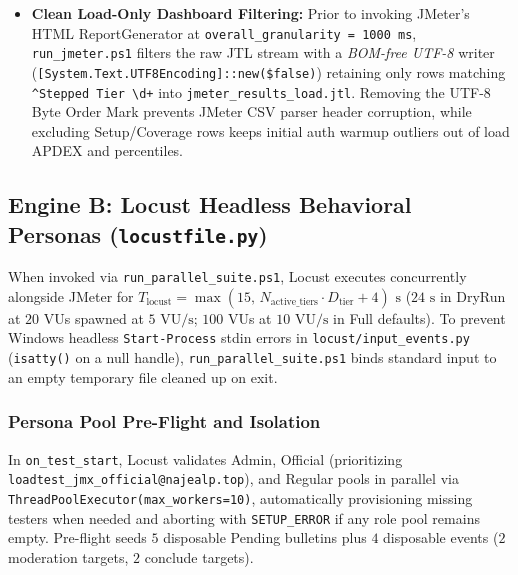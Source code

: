 \documentclass[11pt,letterpaper]{article}
\begin{document}
\begin{itemize}
  \begin{equation}
    \label{eq:think}
    T_{\text{think}} \sim \mathcal{U}(t_{\min},\, t_{\min} + \Delta t) = \mathcal{U}(1500,\, 4000)\text{ ms}, \qquad \mathbb{E}[T_{\text{think}}] = 2750\text{ ms}.
  \end{equation}
  \item \textbf{Clean Load-Only Dashboard Filtering:} Prior to invoking JMeter's HTML ReportGenerator at \texttt{overall\_granularity = 1000 ms}, \texttt{run\_jmeter.ps1} filters the raw JTL stream with a \emph{BOM-free UTF-8} writer (\texttt{[System.Text.UTF8Encoding]::new(\$false)}) retaining only rows matching \texttt{\^{}Stepped Tier \textbackslash d+} into \texttt{jmeter\_results\_load.jtl}. Removing the UTF-8 Byte Order Mark prevents JMeter CSV parser header corruption, while excluding Setup/Coverage rows keeps initial auth warmup outliers out of load APDEX and percentiles.
\end{itemize}

\subsection{Engine B: Locust Headless Behavioral Personas (\texttt{locustfile.py})}
When invoked via \texttt{run\_parallel\_suite.ps1}, Locust executes concurrently alongside JMeter for $T_{\text{locust}} = \max(15,\, N_{\text{active\_tiers}} \cdot D_{\text{tier}} + 4)\text{ s}$ ($24\text{ s}$ in DryRun at $20$ VUs spawned at $5\text{ VU/s}$; $100$ VUs at $10\text{ VU/s}$ in Full defaults). To prevent Windows headless \texttt{Start-Process} stdin errors in \texttt{locust/input\_events.py} (\texttt{isatty()} on a null handle), \texttt{run\_parallel\_suite.ps1} binds standard input to an empty temporary file cleaned up on exit.

\subsubsection{Persona Pool Pre-Flight and Isolation}
In \texttt{on\_test\_start}, Locust validates Admin, Official (prioritizing \texttt{loadtest\_\allowbreak jmx\_\allowbreak official@\allowbreak najealp.top}), and Regular pools in parallel via \texttt{ThreadPoolExecutor(max\_workers=10)}, automatically provisioning missing testers when needed and aborting with \texttt{SETUP\_ERROR} if any role pool remains empty. Pre-flight seeds $5$ disposable Pending bulletins plus $4$ disposable events ($2$ moderation targets, $2$ conclude targets).
\end{document}
